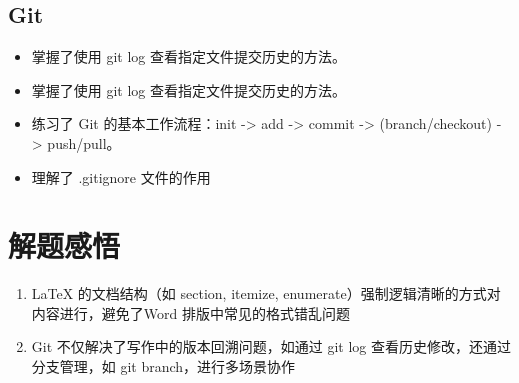 \documentclass[10.5pt]{ctexart}
\begin{document}
\subsection{Git}
\begin{itemize}
\item 掌握了使用 git log 查看指定文件提交历史的方法。
\item 掌握了使用 git log 查看指定文件提交历史的方法。
\item 练习了 Git 的基本工作流程：init -> add -> commit -> (branch/checkout) -> push/pull。
\item 理解了 .gitignore 文件的作用
\end{itemize}

\section{解题感悟}
\begin{enumerate}
    \item LaTeX 的文档结构（如 section{}, itemize, enumerate）强制逻辑清晰的方式对内容进行，避免了Word 排版中常见的格式错乱问题
    \item Git 不仅解决了写作中的版本回溯问题，如通过 git log 查看历史修改，还通过分支管理，如 git branch，进行多场景协作
\end{enumerate}
\end{document}
